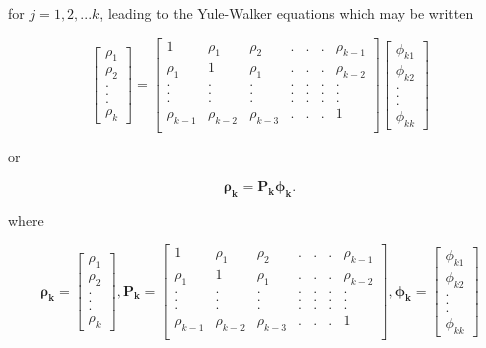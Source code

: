 \documentclass[
  11pt,
  a4paper,
]{report}
\begin{document}
for \(j=1, 2, ...k\), leading to the Yule-Walker equations which may be
written

\begin{equation}
\left[\begin{array}
{r}
\rho_1  \\
\rho_2  \\
.\\
.\\
.\\
\rho_k
\end{array}\right] = \left[\begin{array}
{rrrrrrr}
1 & \rho_1 & \rho_2 & .&.&.& \rho_{k-1} \\
\rho_1 & 1 & \rho_1 & .&.&.& \rho_{k-2} \\
. & . & . & .&.&.& . \\
. & . & . & .&.&.& . \\
. & . & . & .&.&.& . \\
\rho_{k-1} & \rho_{k-2} & \rho_{k-3} & .&.&.& 1 \\
\end{array}\right] \left[\begin{array}
{r}
\phi_{k1}  \\
\phi_{k2}  \\
.\\
.\\
.\\
\phi_{kk}
\end{array}\right]
\end{equation}

or

\[\bm{\rho_k}=\bm{P_k\phi_k}.\]

where

\[\bm{\rho_k} = \left[\begin{array}
{r}
\rho_1  \\
\rho_2  \\
.\\
.\\
.\\
\rho_k
\end{array}\right], \bm{P_k} =\left[\begin{array}
{rrrrrrr}
1 & \rho_1 & \rho_2 & .&.&.& \rho_{k-1} \\
\rho_1 & 1 & \rho_1 & .&.&.& \rho_{k-2} \\
. & . & . & .&.&.& . \\
. & . & . & .&.&.& . \\
. & . & . & .&.&.& . \\
\rho_{k-1} & \rho_{k-2} & \rho_{k-3} & .&.&.& 1 \\
\end{array}\right], \bm{\phi_k} = \left[\begin{array}
{r}
\phi_{k1}  \\
\phi_{k2}  \\
.\\
.\\
.\\
\phi_{kk}
\end{array}\right]\]
\end{document}
